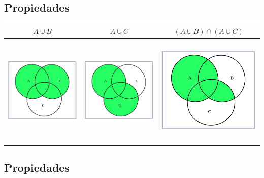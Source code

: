 \documentclass[]{book}
\begin{document}
\hypertarget{propiedades-2}{%
\subsection{Propiedades}\label{propiedades-2}}

\begin{longtable}[]{@{}ccc@{}}
\toprule
\(A\cup B\) & \(A\cup C\) & \((A\cup B)\cap (A\cup C)\)\tabularnewline
\midrule
\endhead
\includegraphics[width=\textwidth,height=2.08333in]{Images/proba1dibujos/distr21.jpg} & \includegraphics[width=\textwidth,height=2.08333in]{Images/proba1dibujos/distr22.jpg} & \includegraphics[width=\textwidth,height=2.08333in]{Images/proba1dibujos/distr23.jpg}\tabularnewline
\bottomrule
\end{longtable}

\hypertarget{propiedades-3}{%
\subsection{Propiedades}\label{propiedades-3}}
\end{document}
